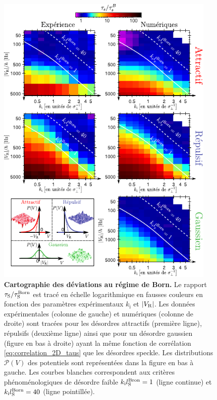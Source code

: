 \begin{figure}
\centering
\includegraphics[width=0.95\textwidth]{Fig/TauS_PRL/map_deviations_born.pdf}
\caption{\textbf{Cartographie des déviations au régime de Born.} Le rapport $\tau_{\mathrm{S}}/\tau_{\mathrm{S}}^{\mathrm{Born}}$ est tracé en échelle logarithmique en fausses couleurs en fonction des paramètres expérimentaux $k_{\mathrm{i}}$ et $|V_{\mathrm{R}}|$. Les données expérimentales (colonne de gauche) et numériques (colonne de droite) sont tracées pour les désordres attractifs (première ligne), répulsifs (deuxième ligne) ainsi que pour un désordre gaussien (figure en bas à droite) ayant la même fonction de corrélation \ref{eq:correlation_2D_taus} que les désordres speckle. Les distributions $\mathcal{P}(V)$ des potentiels sont représentées dans la figure en bas à gauche. Les courbes blanches correspondent aux critères phénoménologiques de désordre faible $k_{\mathrm{i}}l_{\mathrm{S}}^{\mathrm{Bron}}=1$ (ligne continue) et $k_{\mathrm{i}}l_{\mathrm{S}}^{\mathrm{Born}}=40$ (ligne pointillée). }
\label{fig:map_deviations_born}
\end{figure}

